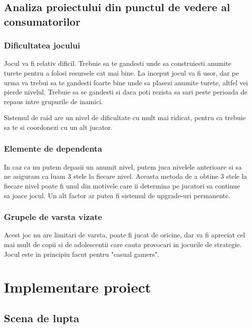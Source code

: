 \documentclass[12pt, a4paper]{article}
\begin{document}
	
	\subsection{Analiza proiectului din punctul de vedere al consumatorilor}
	
	\subsubsection{Dificultatea jocului}
	
	Jocul va fi relativ dificil. Trebuie sa te gandesti unde sa construiesti anumite turete pentru a folosi resursele cat mai bine. La inceput jocul va fi usor, dar pe urma va trebui sa te gandesti foarte bine unde sa plasezi anumite turete, altfel vei pierde nivelul. Trebuie sa se gandesti si daca poti rezista sa sari peste perioada de repaus intre grupurile de inamici.
	
	Sistemul de raid are un nivel de dificultate cu mult mai ridicat, pentru ca trebuie sa te si coordonezi cu un alt jucator.
	
	
	
	\subsubsection{Elemente de dependenta}
	
	In caz ca nu putem depasii un anumit nivel, putem juca nivelele anterioare si sa ne asiguram ca luam 3 stele la fiecare nivel. Aceasta metoda de a obtine 3 stele la fiecare nivel poate fi unul din motivele care ii determina pe jucatori sa continue sa joace jocul. Un alt factor ar putea fi sistemul de upgrade-uri permanente.
	
	
	
	\subsubsection{Grupele de varsta vizate}
	
	Acest joc nu are limitari de varsta, poate fi jucat de oricine, dar va fi apreciat cel mai mult de copii si de adolescentii care cauta provocari in jocurile de strategie. Jocul este in principiu facut pentru "casual gamers".
	
	
	
	\section{Implementare proiect}
	
	\subsection{Scena de lupta}
	
\end{document}
